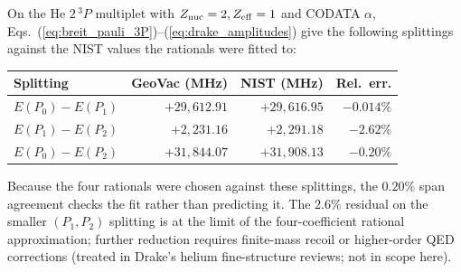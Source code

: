 \documentclass[aps,pra,twocolumn,superscriptaddress,longbibliography]{revtex4-2}
\begin{document}
On the He $2\,^3\!P$ multiplet with $Z_{\rm nuc} = 2, Z_{\rm eff} = 1$
and CODATA $\alpha$, Eqs.~(\ref{eq:breit_pauli_3P})--(\ref{eq:drake_amplitudes})
give the following splittings against the NIST values the rationals
were fitted to:
\begin{center}
  \begin{tabular}{lrrr}
    \toprule
    Splitting & GeoVac (MHz) & NIST (MHz) & Rel.\ err.\\
    \midrule
    $E(P_0) - E(P_1)$ & $+29{,}612.91$ & $+29{,}616.95$ & $-0.014\%$\\
    $E(P_1) - E(P_2)$ & $ +2{,}231.16$ & $ +2{,}291.18$ & $-2.62\%$\\
    $E(P_0) - E(P_2)$ & $+31{,}844.07$ & $+31{,}908.13$ & $-0.20\%$\\
    \bottomrule
  \end{tabular}
\end{center}
Because the four rationals were chosen against these splittings, the
$0.20\%$ span agreement checks the fit rather than predicting it.  The $2.6\%$ residual on the
smaller $(P_1, P_2)$ splitting is at the limit of the
four-coefficient rational approximation; further reduction requires
finite-mass recoil or higher-order QED corrections (treated in
Drake's helium fine-structure reviews; not in scope here).
\end{document}
